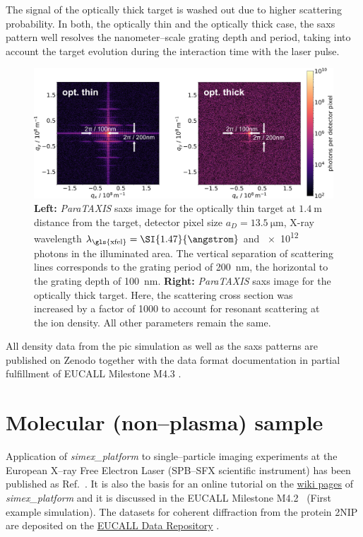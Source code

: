 \documentclass[10pt]{scrartcl}
\begin{document}
The signal of the optically thick target is washed out due to
higher scattering probability. In both, the optically thin and the optically
thick case, the
\gls{saxs} pattern well resolves the nanometer--scale grating depth and period, taking
into account the target evolution during the interaction time with the laser
pulse.
%
\begin{figure}[ht]
  \centering
  \includegraphics[width=.99\linewidth]{figures/scattering_images_v2.png}
  \caption{
    \textbf{Left:} \textit{ParaTAXIS} \gls{saxs} image for the optically thin target at
    $\SI{1.4}{\metre}$ distance from the target, detector pixel size $a_D =
    \SI{13.5}{\micro\metre}$, X-ray wavelength $\lambda_\mathrm{\gls{xfel}} =
    \SI{1.47}{\angstrom}$ and
    \num{e12} photons in the illuminated area. The vertical separation of scattering
    lines corresponds to the grating period of \SI{200}{\nano\metre}, the horizontal to
    the grating depth of \SI{100}{\nano\metre}.
    \textbf{Right:} \textit{ParaTAXIS} \gls{saxs} image for the optically thick target. Here, the
    scattering cross section was increased by a factor of \num{1000} to account for
  resonant scattering at the ion density. All other parameters remain the same.  }
  \label{fig:scattering}
\end{figure}

All density data from the \gls{pic} simulation as well as the \gls{saxs} patterns are
published on Zenodo together with the data format documentation
\cite{Garten2017.zenodo.885033} in partial fulfillment of EUCALL Milestone M4.3
\cite{EUCALL_SIMEX_M4.3}.

\section{Molecular (non--plasma) sample}
Application of \textit{simex\_platform} to single--particle imaging experiments
at the European X--ray Free Electron Laser (SPB--SFX scientific instrument) has
been published as Ref.~\cite{Fortmann-Grote2017}. It is also the basis for an
online tutorial on the
\href{https://www.github.com/eucall-software/simex_platform/wiki/SimEx-Tutorial}{wiki
pages} of \textit{simex\_platform} and it is
discussed in the EUCALL Milestone M4.2~\cite{EUCALL_SIMEX_M4.2} (First example
simulation).
The datasets for coherent diffraction from the protein 2NIP are deposited on
the \href{https://www.zenodo.org/communities/eucall-data}{EUCALL Data
Repository} \cite{Fortmann-Grote2017.zenodo.886087}.
\end{document}
